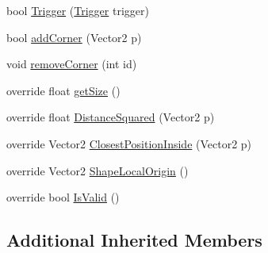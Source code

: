 \begin{DoxyCompactItemize}
\item 
bool \hyperlink{classgearit_1_1src_1_1robot_1_1_heart_a36566816f461fac49912ebc61d0f9ad4}{Trigger} (\hyperlink{classgearit_1_1src_1_1map_1_1_trigger}{Trigger} trigger)
\item 
bool \hyperlink{classgearit_1_1src_1_1robot_1_1_heart_a5b57c83c92c934c6973c27d4593bd6d0}{add\+Corner} (Vector2 p)
\item 
void \hyperlink{classgearit_1_1src_1_1robot_1_1_heart_ab80c951fd2929d4e0da256816d9fe8b9}{remove\+Corner} (int id)
\item 
override float \hyperlink{classgearit_1_1src_1_1robot_1_1_heart_a04aa4abe0ad58c7fe7049d12bec75782}{get\+Size} ()
\item 
override float \hyperlink{classgearit_1_1src_1_1robot_1_1_heart_aa168294845abc76d160077e60a5d8ed8}{Distance\+Squared} (Vector2 p)
\item 
override Vector2 \hyperlink{classgearit_1_1src_1_1robot_1_1_heart_ab4622425c42f5010e5def4d6d93fbc06}{Closest\+Position\+Inside} (Vector2 p)
\item 
override Vector2 \hyperlink{classgearit_1_1src_1_1robot_1_1_heart_a8a6e44525d8d48b4e82c91bc74ec63bf}{Shape\+Local\+Origin} ()
\item 
override bool \hyperlink{classgearit_1_1src_1_1robot_1_1_heart_adec972aa89332e630fcf7d09bd86c90c}{Is\+Valid} ()
\end{DoxyCompactItemize}
\subsection*{Additional Inherited Members}


